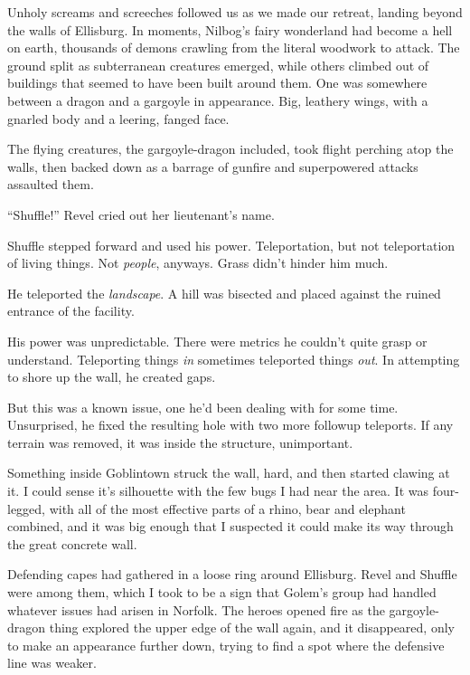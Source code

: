 





Unholy screams and screeches followed us as we made our retreat, landing beyond the walls of Ellisburg.  In moments, Nilbog's fairy wonderland had become a hell on earth, thousands of demons crawling from the literal woodwork to attack.  The ground split as subterranean creatures emerged, while others climbed out of buildings that seemed to have been built around them.  One was somewhere between a dragon and a gargoyle in appearance.  Big, leathery wings, with a gnarled body and a leering, fanged face.



The flying creatures, the gargoyle-dragon included, took flight perching atop the walls, then backed down as a barrage of gunfire and superpowered attacks assaulted them.



``Shuffle!'' Revel cried out her lieutenant's name.



Shuffle stepped forward and used his power.  Teleportation, but not teleportation of living things.  Not \emph{people}, anyways.  Grass didn't hinder him much.



He teleported the \emph{landscape}.  A hill was bisected and placed against the ruined entrance of the facility.



His power was unpredictable.  There were metrics he couldn't quite grasp or understand.  Teleporting things \emph{in} sometimes teleported things \emph{out}.  In attempting to shore up the wall, he created gaps.



But this was a known issue, one he'd been dealing with for some time.  Unsurprised, he fixed the resulting hole with two more followup teleports.  If any terrain was removed, it was inside the structure, unimportant.



Something inside Goblintown struck the wall, hard, and then started clawing at it.  I could sense it's silhouette with the few bugs I had near the area.  It was four-legged, with all of the most effective parts of a rhino, bear and elephant combined, and it was big enough that I suspected it could make its way through the great concrete wall.



Defending capes had gathered in a loose ring around Ellisburg.  Revel and Shuffle were among them, which I took to be a sign that Golem's group had handled whatever issues had arisen in Norfolk.  The heroes opened fire as the gargoyle-dragon thing explored the upper edge of the wall again, and it disappeared, only to make an appearance further down, trying to find a spot where the defensive line was weaker.




